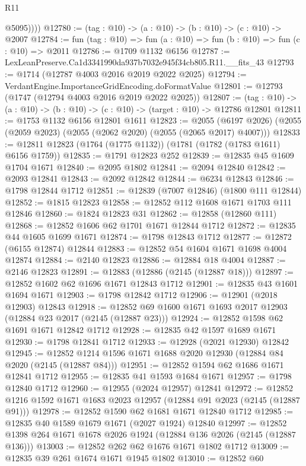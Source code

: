 \begin{lexlean}{R11}
\begin{coremodule}
            @5095))))
@12780 := (tag : @10) -> (a : @10) -> (b : @10) -> (c : @10) -> @2007
@12784 := fun (tag : @10) => fun (a : @10) => fun (b : @10) => fun (c : @10) => @2011
@12786 := @1709 @1132 @6156
@12787 := LexLeanPreserve.Ca1d3341990da937b7032e945f34cb805.R11.__fits_43
@12793 := @1714 (@12787 @4003 @2016 @2019 @2022 @2025)
@12794 := VerdantEngine.ImportanceGridEncoding.doFormatValue
@12801 := @12793 (@1747 (@12794 @4003 @2016 @2019 @2022 @2025))
@12807 := (tag : @10) -> (a : @10) -> (b : @10) -> (c : @10) -> (target : @10) -> @12786 @12801
@12811 := @1753 @1132 @6156 @12801 @1611
@12823 := @2055
    (@6197 @2026)
    (@2055 (@2059 @2023) (@2055 (@2062 @2020) (@2055 (@2065 @2017) @4007)))
@12833 := @12811 @12823 (@1764 (@1775 @1132)) (@1781 (@1782 (@1783 @1611) @6156 @1759))
@12835 := @1791 @12823 @252
@12839 := @12835 @45 @1609 @1704 @1671
@12840 := @2095 @1802
@12841 := @2094 @12840
@12842 := @2093 @12841
@12843 := @2092 @12842
@12844 := @6234 @12843
@12846 := @1798 @12844 @1712
@12851 := @12839 (@7007 @12846) (@1800 @111 @12844)
@12852 := @1815 @12823
@12858 := @12852 @112 @1608 @1671 @1703 @111 @12846
@12860 := @1824 @12823 @31
@12862 := @12858 (@12860 @111)
@12868 := @12852 @1606 @62 @1701 @1671 @12844 @1712
@12872 := @12835 @44 @1605 @1699 @1671
@12874 := @1798 @12843 @1712
@12877 := @12872 (@6155 @12874) @12844
@12883 := @12852 @54 @1604 @1671 @1698 @4004 @12874
@12884 := @2140 @12823
@12886 := @12884 @18 @4004
@12887 := @2146 @12823
@12891 := @12883 (@12886 (@2145 (@12887 @18)))
@12897 := @12852 @1602 @62 @1696 @1671 @12843 @1712
@12901 := @12835 @43 @1601 @1694 @1671
@12903 := @1798 @12842 @1712
@12906 := @12901 (@2018 @12903) @12843
@12918 := @12852 @69 @1600 @1671 @1693 @2017 @12903 (@12884 @23 @2017 (@2145 (@12887 @23)))
@12924 := @12852 @1598 @62 @1691 @1671 @12842 @1712
@12928 := @12835 @42 @1597 @1689 @1671
@12930 := @1798 @12841 @1712
@12933 := @12928 (@2021 @12930) @12842
@12945 := @12852 @1214 @1596 @1671 @1688 @2020 @12930 (@12884 @84 @2020 (@2145 (@12887 @84)))
@12951 := @12852 @1594 @62 @1686 @1671 @12841 @1712
@12955 := @12835 @41 @1593 @1684 @1671
@12957 := @1798 @12840 @1712
@12960 := @12955 (@2024 @12957) @12841
@12972 := @12852 @1216 @1592 @1671 @1683 @2023 @12957 (@12884 @91 @2023 (@2145 (@12887 @91)))
@12978 := @12852 @1590 @62 @1681 @1671 @12840 @1712
@12985 := @12835 @40 @1589 @1679 @1671 (@2027 @1924) @12840
@12997 := @12852 @1398 @264 @1671 @1678 @2026 @1924 (@12884 @136 @2026 (@2145 (@12887 @136)))
@13003 := @12852 @262 @62 @1676 @1671 @1802 @1712
@13009 := @12835 @39 @261 @1674 @1671 @1945 @1802
@13010 := @12852 @60

\end{coremodule}
\end{lexlean}
